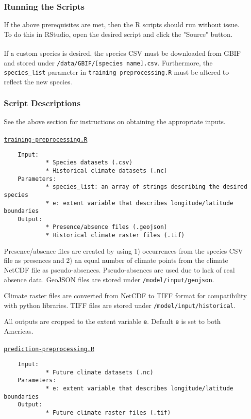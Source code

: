 \documentclass{article}
\begin{document}
\subsubsection*{Running the Scripts}

If the above prerequisites are met, then the R scripts should run without issue. To do this in RStudio, open the desired script and click the "Source" button.
\\\\
If a custom species is desired, the species CSV must be downloaded from GBIF and stored under \texttt{/data/GBIF/[species name].csv}. Furthermore, the \texttt{species\_list} parameter in \texttt{training-preprocessing.R} must be altered to reflect the new species. 

\subsubsection*{Script Descriptions}
See the above section for instructions on obtaining the appropriate inputs.
\\\\
\texttt{\underline{{training-preprocessing.R}}}
\begin{verbatim}
	Input:	
			* Species datasets (.csv)
			* Historical climate datasets (.nc)
	Parameters:
			* species_list: an array of strings describing the desired species 
			* e: extent variable that describes longitude/latitude boundaries 
	Output:
			* Presence/absence files (.geojson)
			* Historical climate raster files (.tif)
\end{verbatim}

Presence/absence files are created by using 1) occurrences from the species CSV file as presences and 2) an equal number of climate points from the climate NetCDF file as pseudo-absences. Pseudo-absences are used due to lack of real absence data. GeoJSON files are stored under \texttt{/model/input/geojson}.

Climate raster files are converted from NetCDF to TIFF format for compatibility with python libraries. TIFF files are stored under \texttt{/model/input/historical}.

All outputs are cropped to the extent variable \texttt{e}. Default \texttt{e} is set to both Americas.
\\\\
\texttt{\underline{prediction-preprocessing.R}}
\begin{verbatim}
	Input:	
			* Future climate datasets (.nc)
	Parameters:
			* e: extent variable that describes longitude/latitude boundaries 
	Output:
			* Future climate raster files (.tif)
\end{verbatim}
\end{document}
